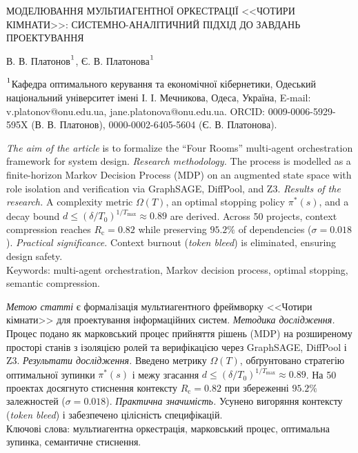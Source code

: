 \documentclass[12pt, reqno, a4paper]{amsart}
\theoremstyle{definition}
\theoremstyle{plain}
\theoremstyle{plain}
\theoremstyle{plain}
\theoremstyle{remark}
\theoremstyle{plain}
\begin{document}
{%
 \begin{Title}
МОДЕЛЮВАННЯ МУЛЬТИАГЕНТНОЇ ОРКЕСТРАЦІЇ <<ЧОТИРИ КІМНАТИ>>: СИСТЕМНО-АНАЛІТИЧНИЙ ПІДХІД ДО ЗАВДАНЬ ПРОЕКТУВАННЯ
 \end{Title}

  \begin{Authors}
{В. В. Платонов${\mathstrut}^1$, Є. В. Платонова${\mathstrut}^1$}
  \end{Authors}

{\scriptsize \noindent ${\mathstrut}^1$Кафедра оптимального керування та економічної кібернетики, Одеський національний університет імені І. І. Мечникова, Одеса, Україна, E-mail: v.platonov@onu.edu.ua, jane.platonova@onu.edu.ua. ORCID: 0009-0006-5929-595X (В. В. Платонов), 0000-0002-6405-5604 (Є. В. Платонова).
}

\begin{Abstract}
\textit{The aim of the article} is to formalize the ``Four Rooms'' multi-agent orchestration framework for system design.
\textit{Research methodology.} The process is modelled as a finite-horizon Markov Decision Process (MDP) on an augmented state space with role isolation and verification via GraphSAGE, DiffPool, and Z3.
\textit{Results of the research.} A complexity metric $\Omega(T)$, an optimal stopping policy $\pi^*(s)$, and a decay bound $d \le (\delta / T_0)^{1/T_{\max}} \approx 0.89$ are derived. Across 50 projects, context compression reaches $R_{\text{c}} = 0.82$ while preserving $95.2\%$ of dependencies ($\sigma = 0.018$).
\textit{Practical significance.} Context burnout (\textit{token bleed}) is eliminated, ensuring design safety.
    \\
{\sc Keywords:} multi-agent orchestration, Markov decision process, optimal stopping, semantic compression.
\end{Abstract}

\begin{Abstract_u}
\textit{Метою статті} є формалізація мультиагентного фреймворку <<Чотири кімнати>> для проектування інформаційних систем.
\textit{Методика дослідження.} Процес подано як марковський процес прийняття рішень (MDP) на розширеному просторі станів з ізоляцією ролей та верифікацією через GraphSAGE, DiffPool і Z3.
\textit{Результати дослідження.} Введено метрику $\Omega(T)$, обґрунтовано стратегію оптимальної зупинки $\pi^*(s)$ і межу згасання $d \le (\delta / T_0)^{1/T_{\max}} \approx 0.89$. На 50 проектах досягнуто стиснення контексту $R_{\text{c}} = 0.82$ при збереженні $95.2\%$ залежностей ($\sigma = 0.018$).
\textit{Практична значимість.} Усунено вигоряння контексту (\textit{token bleed}) і забезпечено цілісність специфікацій.
    \\
    {\sc Ключові слова:} мультиагентна оркестрація, марковський процес, оптимальна зупинка, семантичне стиснення.
  \end{Abstract_u}


}
\end{document}
